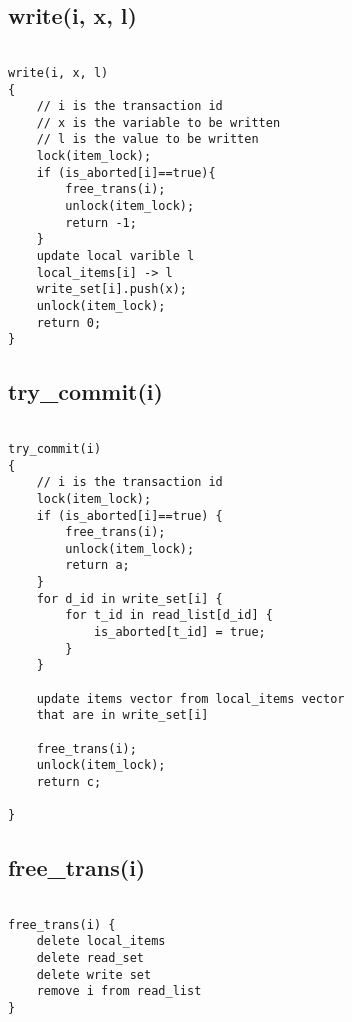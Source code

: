 \documentclass[12pt]{article}
\begin{document}
\subsection*{write(i, x, l)}

\begin{lstlisting}

write(i, x, l)
{
    // i is the transaction id
    // x is the variable to be written
    // l is the value to be written
    lock(item_lock);
    if (is_aborted[i]==true){
        free_trans(i);
        unlock(item_lock);
        return -1;
    }    
    update local varible l
    local_items[i] -> l
    write_set[i].push(x);
    unlock(item_lock);
    return 0;
}

\end{lstlisting}

\subsection*{try\_commit(i)}

\begin{lstlisting}
    
try_commit(i)
{
    // i is the transaction id
    lock(item_lock);
    if (is_aborted[i]==true) {
        free_trans(i);
        unlock(item_lock);
        return a;
    }
    for d_id in write_set[i] {
        for t_id in read_list[d_id] {
            is_aborted[t_id] = true;
        }
    }
    
    update items vector from local_items vector 
    that are in write_set[i]

    free_trans(i);
    unlock(item_lock);
    return c;

}

\end{lstlisting}

\subsection*{free\_trans(i)}

\begin{lstlisting}
    
free_trans(i) {
    delete local_items 
    delete read_set
    delete write set
    remove i from read_list
}

\end{lstlisting}
\end{document}
